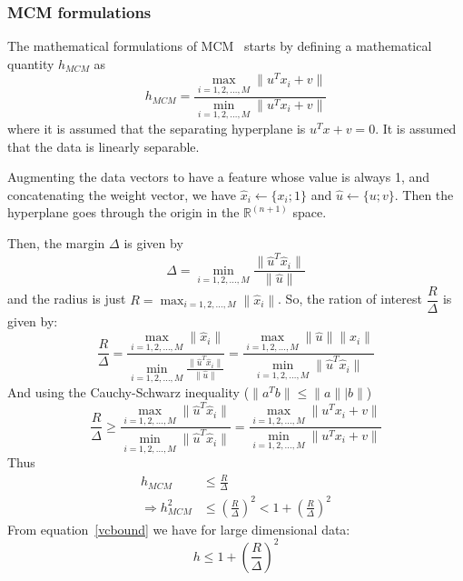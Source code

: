 \documentclass[11pt]{article}
\begin{document}
\subsubsection{MCM formulations}
The mathematical formulations of MCM~\cite{MCM} starts by defining a
mathematical quantity $h_{MCM}$ as
\begin{equation}
    h_{MCM}=\frac{\max_{i=1,2,\dotsc,M}\lVert u^Tx_i+v\rVert}{\min_{i=1,2,\dotsc,M}\lVert u^Tx_i+v\rVert}
\end{equation}
where it is assumed that the separating hyperplane is $u^Tx+v=0$. It is assumed
that the data is linearly separable.\par
Augmenting the data vectors to have a feature whose value is always 1, and
concatenating the weight vector, we have $\hat{x}_i\gets\{x_i;1\}$ and
$\hat{u}\gets \{u;v\}$. Then the hyperplane goes through the origin in the
$\mathbb{R}^{(n+1)}$ space.\par
Then, the margin $\Delta$ is given by
\begin{equation}
    \Delta=\min_{i=1,2,\dotsc,M}\frac{\lVert\hat{u}^T\hat{x}_i\rVert}{\lVert\hat{u}\rVert}
\end{equation}
and the radius is just $R=\max_{i=1,2,\dotsc,M}\lVert\hat{x}_i\rVert$. So, the
ration of interest $\dfrac{R}{\Delta}$ is given by:
\begin{equation}
    \frac{R}{\Delta}=\frac{\max_{i=1,2,\dotsc,M}\lVert\hat{x}_i\rVert}{\min_{i=1,2,\dotsc,M}\frac{\lVert\hat{u}^T\hat{x}_i\rVert}{\lVert\hat{u}\rVert}}=\frac{\max_{i=1,2,\dotsc,M}\lVert\hat{u}\rVert\lVert\hat{x}_i\rVert}{\min_{i=1,2,\dotsc,M}\lVert\hat{u}^T\hat{x}_i\rVert}
\end{equation}
And using the Cauchy-Schwarz inequality ($\lVert a^Tb\rVert\le\lVert
a\rVert\lvert b\rVert$)
\begin{equation}
    \frac{R}{\Delta}\ge\frac{\max_{i=1,2,\dotsc,M}\lVert\hat{u}^T\hat{x}_i\rVert}{\min_{i=1,2,\dotsc,M}\lVert\hat{u}^T\hat{x}_i\rVert}=\frac{\max_{i=1,2,\dotsc,M}\lVert u^Tx_i+v\rVert}{\min_{i=1,2,\dotsc,M}\lVert
    u^Tx_i+v\rVert}
\end{equation}
Thus
\begin{align}
    h_{MCM}&\le\frac{R}{\Delta}\\
    \Rightarrow
    h_{MCM}^2&\le\left(\frac{R}{\Delta}\right)^2<1+\left(\frac{R}{\Delta}\right)^2
\end{align}
From equation~\ref{vcbound} we have for large dimensional data:
\begin{equation}
    h\le 1+\left(\frac{R}{\Delta}\right)^2
\end{equation}
\end{document}
